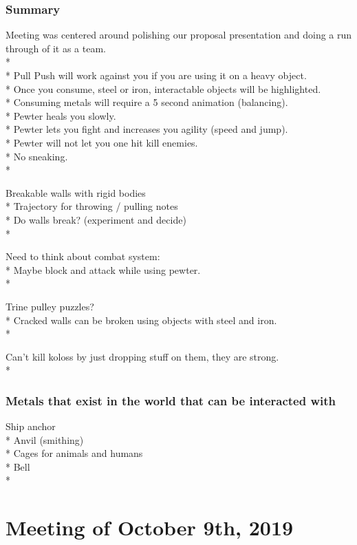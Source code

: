 \documentclass{article}
\begin{document}
\subsubsection{Summary}
Meeting was centered around polishing our proposal presentation and doing a run through of it as a team.\\*
\\*
Pull Push will work against you if you are using it on a heavy object.\\*
Once you consume, steel or iron, interactable objects will be highlighted.\\*
Consuming metals will require a 5 second animation (balancing).\\*
Pewter heals you slowly.\\*
Pewter lets you fight and increases you agility (speed and jump).\\*
Pewter will not let you one hit kill enemies.\\*
No sneaking.\\*

Breakable walls with rigid bodies\\*
Trajectory for throwing / pulling notes\\*
Do walls break? (experiment and decide)\\*

Need to think about combat system:\\*
Maybe block and attack while using pewter.\\*


Trine pulley puzzles?\\*
Cracked walls can be broken using objects with steel and iron.\\*

Can’t kill koloss by just dropping stuff on them, they are strong.\\* 

\subsubsection{Metals that exist in the world that can be interacted with}
Ship anchor\\*
Anvil (smithing)\\*
Cages for animals and humans\\*
Bell\\* 






\section{Meeting of October 9th, 2019}
\end{document}
